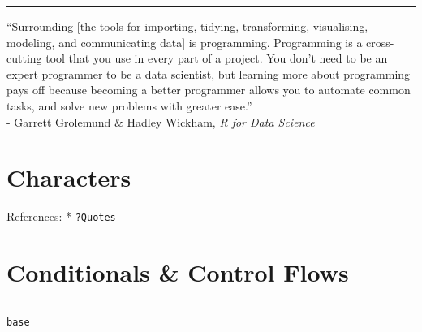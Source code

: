 \documentclass[
]{book}
\begin{document}
\begin{center}\rule{0.5\linewidth}{0.5pt}\end{center}

``Surrounding {[}the tools for importing, tidying, transforming, visualising, modeling, and communicating data{]} is programming. Programming is a cross-cutting tool that you use in every part of a project. You don't need to be an expert programmer to be a data scientist, but learning more about programming pays off because becoming a better programmer allows you to automate common tasks, and solve new problems with greater ease.''\\
- Garrett Grolemund \& Hadley Wickham, \emph{R for Data Science}

\hypertarget{characters}{%
\section{Characters}\label{characters}}

References:
* \texttt{?Quotes}

\hypertarget{conditionals-control-flows}{%
\section{Conditionals \& Control Flows}\label{conditionals-control-flows}}

\begin{center}\rule{0.5\linewidth}{0.5pt}\end{center}

\texttt{base}
\end{document}
